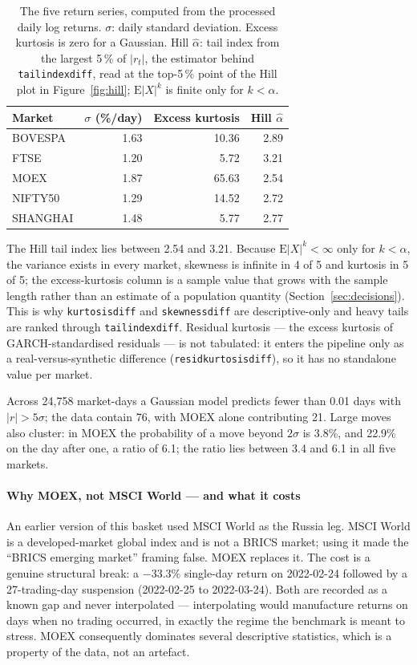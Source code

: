 \documentclass[11pt,a4paper]{article}
\makeatletter
\DeclareRobustCommand{\_}{\ifmmode\nfss@text{\textunderscore}\else\textunderscore\allowbreak\fi}
\makeatother
\begin{document}
\begin{table}[htbp]
\centering
\caption{The five return series, computed from the processed daily log returns. $\sigma$: daily standard deviation. Excess kurtosis is zero for a Gaussian. Hill $\hat\alpha$: tail index from the largest 5\,\% of $|r_t|$, the estimator behind \texttt{tail\_index\_diff}, read at the top-5\,\% point of the Hill plot in Figure~\ref{fig:hill}; $\mathrm{E}|X|^k$ is finite only for $k<\alpha$.}
\label{tab:data}
\begin{tabular}{@{}lrrr@{}}
\toprule
Market & $\sigma$ (\%/day) & Excess kurtosis & Hill $\hat\alpha$ \\
\midrule
BOVESPA & 1.63 & 10.36 & 2.89 \\
FTSE & 1.20 & 5.72 & 3.21 \\
MOEX & 1.87 & 65.63 & 2.54 \\
NIFTY50 & 1.29 & 14.52 & 2.72 \\
SHANGHAI & 1.48 & 5.77 & 2.77 \\
\bottomrule
\end{tabular}
\end{table}

The Hill tail index lies between 2.54 and 3.21. Because $\mathrm{E}|X|^k<\infty$ only for $k<\alpha$, the variance exists in every market, skewness is infinite in 4 of 5 and kurtosis in 5 of 5; the excess-kurtosis column is a sample value that grows with the sample length rather than an estimate of a population quantity (Section~\ref{sec:decisions}). This is why \texttt{kurtosis\_diff} and \texttt{skewness\_diff} are descriptive-only and heavy tails are ranked through \texttt{tail\_index\_diff}. Residual kurtosis --- the excess kurtosis of GARCH-standardised residuals --- is not tabulated: it enters the pipeline only as a real-versus-synthetic difference (\texttt{resid\_kurtosis\_diff}), so it has no standalone value per market.

Across 24,758 market-days a Gaussian model predicts fewer than 0.01 days with $|r|>5\sigma$; the data contain 76, with MOEX alone contributing 21. Large moves also cluster: in MOEX the probability of a move beyond $2\sigma$ is 3.8\%, and 22.9\% on the day after one, a ratio of 6.1; the ratio lies between 3.4 and 6.1 in all five markets.

\paragraph{Why MOEX, not MSCI World --- and what it costs} An earlier version of this basket used MSCI World as the Russia leg. MSCI World is a developed-market global index and is not a BRICS market; using it made the ``BRICS emerging market'' framing false. MOEX replaces it. The cost is a genuine structural break: a $-33.3\%$ single-day return on 2022-02-24 followed by a 27-trading-day suspension (2022-02-25 to 2022-03-24). Both are recorded as a known gap and never interpolated --- interpolating would manufacture returns on days when no trading occurred, in exactly the regime the benchmark is meant to stress. MOEX consequently dominates several descriptive statistics, which is a property of the data, not an artefact.
\end{document}
